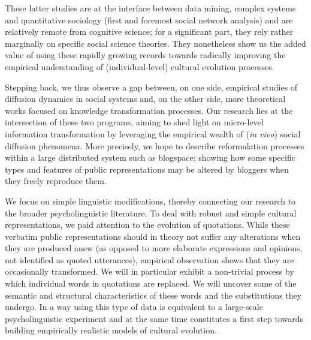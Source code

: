 These latter studies are at the interface between data mining, complex systems and quantitative sociology (first and foremost social network analysis) and are relatively remote from cognitive science; for a significant part, they rely rather marginally on specific social science theories. They nonetheless show us the added value of using these rapidly growing records %
towards radically improving the empirical understanding of (individual-level) cultural evolution processes.


\bigskip
Stepping back, we thus observe a gap between, on one side, empirical studies of diffusion dynamics in social systems and, on the other side, more theoretical works  focused on knowledge transformation processes. %
Our research lies at the intersection of these two programs, aiming to shed light on micro-level information transformation by leveraging the empirical wealth of (\emph{in vivo}) social diffusion phenomena. More precisely, we hope to describe reformulation processes within a large distributed system such as blogspace; showing how some specific types and features of public representations may be altered by bloggers when they freely reproduce them.

We focus on simple linguistic modifications, thereby connecting our research to the broader psycholinguistic literature.
To deal with robust and simple cultural representations, we paid attention to the evolution of quotations.
While these verbatim public representations should in theory not suffer any alterations when they are produced anew (as opposed to more elaborate expressions and opinions, not identified as quoted utterances), empirical observation shows that they are occasionally transformed.
We will in particular exhibit a non-trivial process by which individual words in quotations are replaced.
We will uncover some of the semantic and structural characteristics of these words and the substitutions they undergo.
In a way using this type of data is equivalent to a large-scale psycholinguistic experiment and at the same time constitutes a first step towards building empirically realistic models of cultural evolution.


